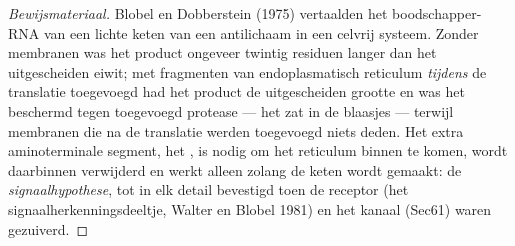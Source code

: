 \begin{proof}[Bewijsmateriaal]
Blobel en Dobberstein (1975) vertaalden het boodschapper-RNA van een
lichte keten van een antilichaam in een celvrij systeem. Zonder
membranen was het product ongeveer twintig residuen langer dan het
uitgescheiden eiwit; met fragmenten van endoplasmatisch reticulum
\emph{tijdens} de translatie toegevoegd had het product de
uitgescheiden grootte en was het beschermd tegen toegevoegd protease
--- het zat in de blaasjes --- terwijl membranen die na de translatie
werden toegevoegd niets deden. Het extra aminoterminale segment, het
, is nodig om het reticulum binnen te komen, wordt
daarbinnen verwijderd en werkt alleen zolang de keten wordt gemaakt: de
\emph{signaalhypothese}, tot in elk detail bevestigd toen de receptor
(het signaalherkenningsdeeltje, Walter en Blobel 1981) en het kanaal
(Sec61) waren gezuiverd.
\end{proof}

